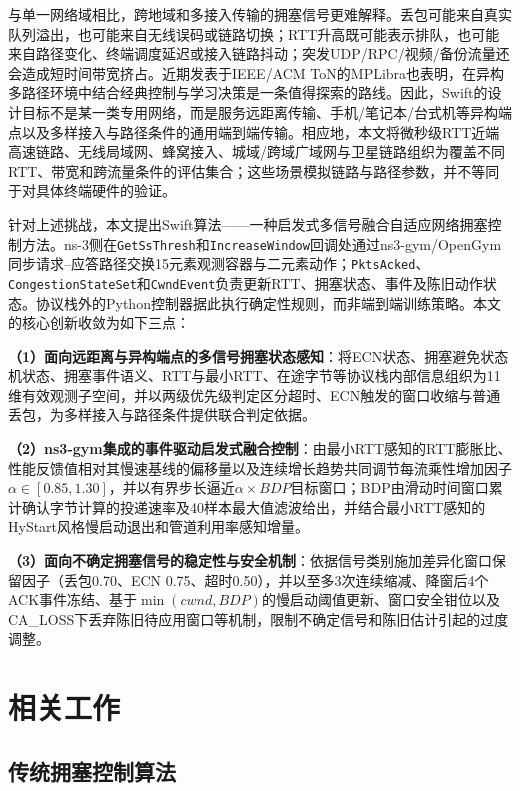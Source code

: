 \documentclass[10pt,twocolumn]{article}
\begin{document}
与单一网络域相比，跨地域和多接入传输的拥塞信号更难解释。丢包可能来自真实队列溢出，也可能来自无线误码或链路切换；RTT升高既可能表示排队，也可能来自路径变化、终端调度延迟或接入链路抖动；突发UDP/RPC/视频/备份流量还会造成短时间带宽挤占。近期发表于IEEE/ACM ToN的MPLibra\cite{mplibra2024}也表明，在异构多路径环境中结合经典控制与学习决策是一条值得探索的路线。因此，Swift的设计目标不是某一类专用网络，而是服务远距离传输、手机/笔记本/台式机等异构端点以及多样接入与路径条件的通用端到端传输。相应地，本文将微秒级RTT近端高速链路、无线局域网、蜂窝接入、城域/跨域广域网与卫星链路组织为覆盖不同RTT、带宽和跨流量条件的评估集合；这些场景模拟链路与路径参数，并不等同于对具体终端硬件的验证。

针对上述挑战，本文提出Swift算法——一种启发式多信号融合自适应网络拥塞控制方法。ns-3侧在\texttt{GetSsThresh}和\texttt{IncreaseWindow}回调处通过ns3-gym/OpenGym\cite{opengym}同步请求--应答路径交换15元素观测容器与二元素动作；\texttt{PktsAcked}、\texttt{CongestionStateSet}和\texttt{CwndEvent}负责更新RTT、拥塞状态、事件及陈旧动作状态。协议栈外的Python控制器据此执行确定性规则，而非端到端训练策略。本文的核心创新收敛为如下三点：

\textbf{（1）面向远距离与异构端点的多信号拥塞状态感知}：将ECN状态、拥塞避免状态机状态、拥塞事件语义、RTT与最小RTT、在途字节等协议栈内部信息组织为11维有效观测子空间，并以两级优先级判定区分超时、ECN触发的窗口收缩与普通丢包，为多样接入与路径条件提供联合判定依据。

\textbf{（2）ns3-gym集成的事件驱动启发式融合控制}：由最小RTT感知的RTT膨胀比、性能反馈值相对其慢速基线的偏移量以及连续增长趋势共同调节每流乘性增加因子$\alpha \in [0.85, 1.30]$，并以有界步长逼近$\alpha \times BDP$目标窗口；BDP由滑动时间窗口累计确认字节计算的投递速率及40样本最大值滤波给出，并结合最小RTT感知的HyStart风格慢启动退出和管道利用率感知增量。

\textbf{（3）面向不确定拥塞信号的稳定性与安全机制}：依据信号类别施加差异化窗口保留因子（丢包0.70、ECN 0.75、超时0.50），并以至多3次连续缩减、降窗后4个ACK事件冻结、基于$\min(cwnd,BDP)$的慢启动阈值更新、窗口安全钳位以及CA\_LOSS下丢弃陈旧待应用窗口等机制，限制不确定信号和陈旧估计引起的过度调整。


\section{相关工作}

\subsection{传统拥塞控制算法}
\end{document}
